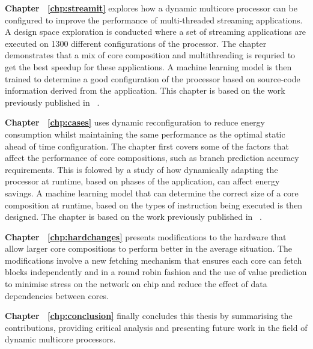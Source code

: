 \textbf{Chapter ~\ref{chp:streamit}} explores how a dynamic multicore processor can be configured to improve the performance of multi-threaded streaming applications.
A design space exploration is conducted where a set of streaming applications are executed on 1300 different configurations of the processor.
The chapter demonstrates that a mix of core composition and multithreading is requried to get the best speedup for these applications.
A machine learning model is then trained to determine a good configuration of the processor based on source-code information derived from the application.
This chapter is based on the work previously published in ~\cite{micolet2016dmpstream}.

\textbf{Chapter ~\ref{chp:cases}} uses dynamic reconfiguration to reduce energy consumption whilst maintaining the same performance as the optimal static ahead of time configuration.
The chapter first covers some of the factors that affect the performance of core compositions, such as branch prediction accuracy requirements.
This is folowed by a study of how dynamically adapting the processor at runtime, based on phases of the application, can affect energy savings.
A machine learning model that can determine the correct size of a core composition at runtime, based on the types of instruction being executed is then designed.
The chapter is based on the work previously published in ~\cite{micolet2017cases}.

\textbf{Chapter ~\ref{chp:hardchanges}} presents modifications to the hardware that allow larger core compositions to perform better in the average situation.
The modifications involve a new fetching mechanism that ensures each core can fetch blocks independently and in a round robin fashion and the use of value prediction to minimise stress on the network on chip and reduce the effect of data dependencies between cores.

\textbf{Chapter ~\ref{chp:conclusion}} finally concludes this thesis by summarising the contributions, providing critical analysis and presenting future work in the field of dynamic multicore processors.